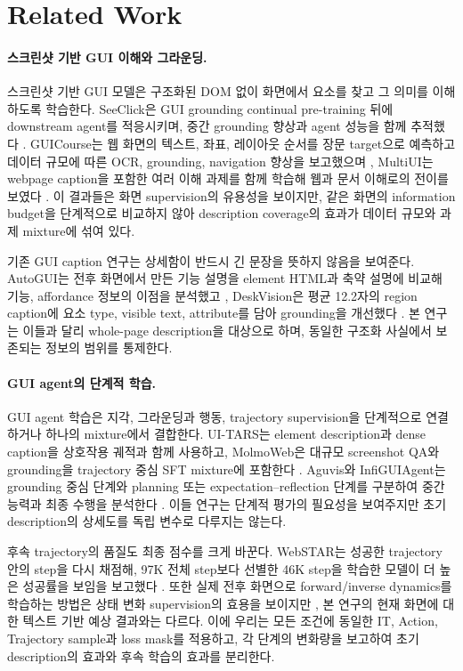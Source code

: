 \section{Related Work}

\paragraph{스크린샷 기반 GUI 이해와 그라운딩.}
스크린샷 기반 GUI 모델은 구조화된 DOM 없이 화면에서 요소를
찾고 그 의미를 이해하도록 학습한다. SeeClick은 GUI grounding
continual pre-training 뒤에 downstream agent를 적응시키며,
중간 grounding 향상과 agent 성능을 함께 추적했다
\citep{cheng2024seeclick}. GUICourse는 웹 화면의 텍스트, 좌표,
레이아웃 순서를 장문 target으로 예측하고 데이터 규모에 따른 OCR,
grounding, navigation 향상을 보고했으며
\citep{chen2025guicourse}, MultiUI는 webpage caption을 포함한
여러 이해 과제를 함께 학습해 웹과 문서 이해로의 전이를 보였다
\citep{liu2025multiui}. 이 결과들은 화면 supervision의 유용성을
보이지만, 같은 화면의 information budget을 단계적으로 비교하지
않아 description coverage의 효과가 데이터 규모와 과제 mixture에
섞여 있다.

기존 GUI caption 연구는 상세함이 반드시 긴 문장을 뜻하지 않음을
보여준다. AutoGUI는 전후 화면에서 만든 기능 설명을 element HTML과
축약 설명에 비교해 기능, affordance 정보의 이점을 분석했고
\citep{li2025autogui}, DeskVision은 평균 12.2자의 region caption에
요소 type, visible text, attribute를 담아 grounding을 개선했다
\citep{xu2025deskvision}. 본 연구는 이들과 달리 whole-page
description을 대상으로 하며, 동일한 구조화 사실에서 보존되는
정보의 범위를 통제한다.

\paragraph{GUI agent의 단계적 학습.}
GUI agent 학습은 지각, 그라운딩과 행동, trajectory supervision을
단계적으로 연결하거나 하나의 mixture에서 결합한다. UI-TARS는
element description과 dense caption을 상호작용 궤적과 함께
사용하고, MolmoWeb은 대규모 screenshot QA와 grounding을
trajectory 중심 SFT mixture에 포함한다
\citep{qin2025uitars,gupta2026molmoweb}. Aguvis와 InfiGUIAgent는
grounding 중심 단계와 planning 또는 expectation--reflection
단계를 구분하여 중간 능력과 최종 수행을 분석한다
\citep{xu2025aguvis,liu2026infiguiagent}. 이들 연구는 단계적 평가의
필요성을 보여주지만 초기 description의 상세도를 독립 변수로
다루지는 않는다.

후속 trajectory의 품질도 최종 점수를 크게 바꾼다. WebSTAR는
성공한 trajectory 안의 step을 다시 채점해, 97K 전체 step보다
선별한 46K step을 학습한 모델이 더 높은 성공률을 보임을
보고했다 \citep{he2026webstar}. 또한 실제 전후 화면으로
forward/inverse dynamics를 학습하는 방법은 상태 변화 supervision의
효용을 보이지만 \citep{liu2026statetransition}, 본 연구의 현재
화면에 대한 텍스트 기반 예상 결과와는 다르다. 이에 우리는 모든
조건에 동일한 IT, Action, Trajectory sample과 loss mask를 적용하고,
각 단계의 변화량을 보고하여 초기 description의 효과와 후속
학습의 효과를 분리한다.
